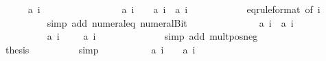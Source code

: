 \begin{isabellebody}
\isanewline
\ \ \ \ \isamarkupfalse%
\ {\isachardoublequoteopen}{\isacharquery}a\ {\isacharparenleft}i\ {\isacharplus}\ {}{\isacharparenright}\ {\isacharless}\ {}{\isachardoublequoteclose}\isanewline
\ \ \ \ \isamarkupfalse%
{\isacharminus}\isanewline
\ \ \ \ \ \ \isamarkupfalse%
\ {\isachardoublequoteopen}{\isacharquery}a\ {\isacharparenleft}i\ {\isacharplus}\ {}{\isacharparenright}\ {\isacharequal}\ {\isacharquery}a\ {\isacharparenleft}i{\isacharplus}{}{\isacharparenright}\ {\isacharasterisk}\ {\isacharquery}a\ {\isacharparenleft}i{\isacharplus}{}{\isacharparenright}\ {\isacharplus}\ {}{\isachardoublequoteclose}\isanewline
\ \ \ \ \ \ \ \ \isamarkupfalse%
\ eq{\isacharbrackleft}rule{\isacharunderscore}format{\isacharcomma}\ of\ {\isachardoublequoteopen}i{\isacharplus}{}{\isachardoublequoteclose}{\isacharbrackright}\isanewline
\ \ \ \ \ \ \ \ \isamarkupfalse%
\ {\isacharparenleft}simp\ add{\isacharcolon}\ numeral{\isacharunderscore}{}{\isacharunderscore}eq{\isacharunderscore}{}\ numeral{\isacharunderscore}Bit{}{\isacharparenright}\isanewline
\ \ \ \ \ \ \isamarkupfalse%
\isanewline
\ \ \ \ \ \ \isamarkupfalse%
\ {\isachardoublequoteopen}{\isacharquery}a\ {\isacharparenleft}i{\isacharplus}{}{\isacharparenright}\ {\isacharasterisk}\ {\isacharquery}a\ {\isacharparenleft}i\ {\isacharplus}\ {}{\isacharparenright}\ {\isacharless}\ {}{\isachardoublequoteclose}\isanewline
\ \ \ \ \ \ \ \ \isamarkupfalse%
\ {\isacharbackquoteopen}{\isacharquery}a\ {\isacharparenleft}i\ {\isacharplus}\ {}{\isacharparenright}\ {\isacharless}\ {}{\isacharbackquoteclose}\ {\isacharbackquoteopen}{\isacharquery}a\ {\isacharparenleft}i\ {\isacharplus}\ {}{\isacharparenright}\ {\isachargreater}\ {}{\isacharbackquoteclose}\isanewline
\ \ \ \ \ \ \ \ \isamarkupfalse%
\ {\isacharparenleft}simp\ add{\isacharcolon}\ mult{\isacharunderscore}pos{\isacharunderscore}neg{\isacharparenright}\isanewline
\ \ \ \ \ \ \isamarkupfalse%
\isanewline
\ \ \ \ \ \ \isamarkupfalse%
\ {\isacharquery}thesis\isanewline
\ \ \ \ \ \ \ \ \isamarkupfalse%
\ simp\isanewline
\ \ \ \ \isamarkupfalse%
\isanewline
\isanewline
\ \ \ \ \isamarkupfalse%
\ {\isachardoublequoteopen}{\isacharquery}a\ {\isacharparenleft}i\ {\isacharplus}\ {}{\isacharparenright}\ {\isacharless}\ {\isacharquery}a\ {\isacharparenleft}i\ {\isacharplus}\ {}{\isacharparenright}{\isachardoublequoteclose}\isanewline

\end{isabellebody}
